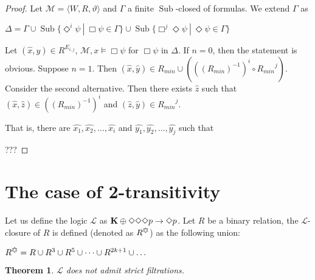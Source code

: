 \documentclass[a4paper]{article}
\theoremstyle{defin}
\theoremstyle{theorem}
\newtheorem{theorem}{Theorem}
\theoremstyle{prop}
\theoremstyle{lemma}
\theoremstyle{fact}
\theoremstyle{ex}
\theoremstyle{col}
\theoremstyle{claim}
\begin{document}
\begin{proof}
  Let $\mathcal{M} = \langle W, R, \vartheta \rangle$ and $\Gamma$ a finite $\operatorname{Sub}$-closed of formulas. We extend $\Gamma$ as
  \begin{center}
    $\Delta = \Gamma \cup \operatorname{Sub}\{  \Diamond^{i} \psi \: | \: \Box \psi \in \Gamma \} \cup \operatorname{Sub}\{ \Box^{j} \Diamond \psi \: | \: \Diamond \psi \in \Gamma \}$
  \end{center}
  Let $(\hat{x}, \hat{y}) \in R^{E_{i,j}}$, $\mathcal{M}, x \models \Box \psi$ for $\Box \psi$ in $\Delta$.
  If $n = 0$, then the statement is obvious. Suppose $n = 1$.
  Then $(\hat{x}, \hat{y}) \in R_{min} \cup (((R_{min})^{-1})^i \circ {R_{min}}^j)$. Consider the second alternative. Then there exists $\hat{z}$ such that $(\hat{x}, \hat{z}) \in ((R_{min})^{-1})^i $ and $(\hat{z}, \hat{y}) \in {R_{min}}^j$.

  That is, there are $\hat{x_1}, \hat{x_2}, \dots, \hat{x_i}$ and $\hat{y_1}, \hat{y_2}, \dots, \hat{y_j}$ such that


  ???
\end{proof}

\section{The case of 2-transitivity}


Let us define the logic $\mathcal{L}$ as ${\bf K} \oplus \Diamond \Diamond \Diamond p \to \Diamond p$. Let $R$ be a binary relation, the $\mathcal{L}$-closure of $R$ is defined (denoted as $R^{\davidsstar}$) as the following union:
\begin{center}
  $R^{\davidsstar} = R \cup R^3 \cup R^5 \cup \dots \cup R^{2k+1} \cup \dots$
\end{center}

\begin{theorem}
  $\mathcal{L}$ does not admit strict filtrations.
\end{theorem}
\end{document}
